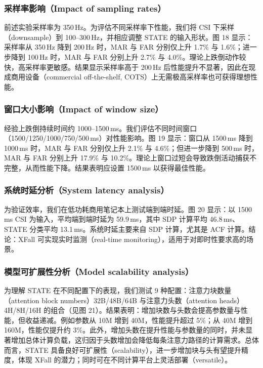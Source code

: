 \documentclass[UTF8,twocolumn]{ctexart}
\begin{document}
\subsubsection{采样率影响（Impact of sampling rates）}
前述实验采样率为 350\,Hz。为评估不同采样率下性能，我们将 CSI 下采样（downsample）到 100--300\,Hz，并相应调整 STATE 的输入形状。图 18 显示：采样率从 350\,Hz 降到 200\,Hz 时，MAR 与 FAR 分别仅上升 1.7\% 与 1.6\%；进一步降到 100\,Hz 时，MAR 与 FAR 分别上升 2.7\% 与 4.0\%。理论上跌倒动作较快，高采样率更敏感。结果显示采样率高于 200\,Hz 后性能提升不显著，因此在现成商用设备（commercial off-the-shelf, COTS）上无需极高采样率也可获得理想性能。

\subsubsection{窗口大小影响（Impact of window size）}
经验上跌倒持续时间约 1000--1500\,ms。我们评估不同时间窗口（1500/1250/1000/750/500\,ms）对性能影响。图 19 显示：窗口从 1500\,ms 降到 1000\,ms 时，MAR 与 FAR 分别仅上升 2.1\% 与 4.6\%；但进一步降到 500\,ms 时，MAR 与 FAR 分别上升 17.9\% 与 10.2\%。理论上窗口过短会导致跌倒活动捕获不完整，从而性能下降。结果表明应设置 1500\,ms 以获得最佳性能。

\subsubsection{系统时延分析（System latency analysis）}
为验证效率，我们在低功耗商用笔记本上测试端到端时延。图 20 显示：以 1500\,ms CSI 为输入，平均端到端时延为 59.9\,ms，其中 SDP 计算平均 46.8\,ms、STATE 分类平均 13.1\,ms。系统时延主要来自 SDP 计算，尤其是 ACF 计算。结论：XFall 可实现实时监测（real-time monitoring），适用于对即时性要求高的场景。

\subsubsection{模型可扩展性分析（Model scalability analysis）}
为理解 STATE 在不同配置下的表现，我们测试 9 种配置：注意力块数量（attention block numbers）32B/48B/64B 与注意力头数（attention heads）4H/8H/16H 的组合（见图 21）。结果表明：增加块数与头数会提高参数量与性能，但收益递减。例如参数从 10M 增到 40M，性能提升超过 5\%；从 40M 增到 160M，性能仅提升约 3\%。此外，增加头数在提升性能与参数量的同时，并未显著增加总体计算负载，这归因于头数增加会降低每条注意力路径的计算需求。总体而言，STATE 具备良好可扩展性（scalability），进一步增加块与头有望提升精度，体现 XFall 的潜力；同时可在不同计算平台上灵活部署（versatile）。
\end{document}
